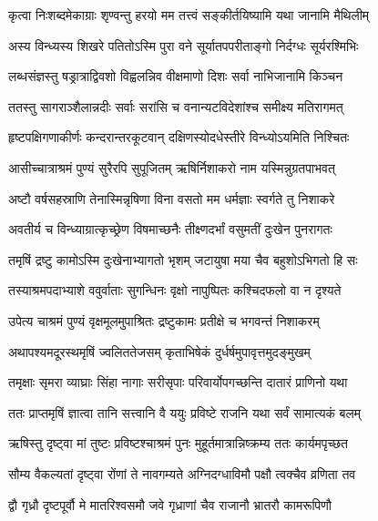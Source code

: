 \twolineshloka
{कृत्वा निःशब्दमेकाग्राः शृण्वन्तु हरयो मम}
{तत्त्वं सङ्कीर्तयिष्यामि यथा जानामि मैथिलीम्} %

\twolineshloka
{अस्य विन्ध्यस्य शिखरे पतितोऽस्मि पुरा वने}
{सूर्यातपपरीताङ्गो निर्दग्धः सूर्यरश्मिभिः} %

\twolineshloka
{लब्धसंज्ञस्तु षड्रात्राद्विवशो विह्वलन्निव}
{वीक्षमाणो दिशः सर्वा नाभिजानामि किञ्चन} %

\twolineshloka
{ततस्तु सागराञ्शैलान्नदीः सर्वाः सरांसि च}
{वनान्यटविदेशांश्च समीक्ष्य मतिरागमत्} %

\twolineshloka
{हृष्टपक्षिगणाकीर्णः कन्दरान्तरकूटवान्}
{दक्षिणस्योदधेस्तीरे विन्ध्योऽयमिति निश्चितः} %

\twolineshloka
{आसीच्चात्राश्रमं पुण्यं सुरैरपि सुपूजितम्}
{ऋषिर्निशाकरो नाम यस्मिन्नुग्रतपाभवत्} %

\twolineshloka
{अष्टौ वर्षसहस्राणि तेनास्मिन्नृषिणा विना}
{वसतो मम धर्मज्ञाः स्वर्गते तु निशाकरे} %

\twolineshloka
{अवतीर्य च विन्ध्याग्रात्कृच्छ्रेण विषमाच्छनैः}
{तीक्ष्णदर्भां वसुमतीं दुःखेन पुनरागतः} %

\twolineshloka
{तमृषिं द्रष्टु कामोऽस्मि दुःखेनाभ्यागतो भृशम्}
{जटायुषा मया चैव बहुशोऽभिगतो हि सः} %

\twolineshloka
{तस्याश्रमपदाभ्याशे ववुर्वाताः सुगन्धिनः}
{वृक्षो नापुष्पितः कश्चिदफलो वा न दृश्यते} %

\twolineshloka
{उपेत्य चाश्रमं पुण्यं वृक्षमूलमुपाश्रितः}
{द्रष्टुकामः प्रतीक्षे च भगवन्तं निशाकरम्} %

\twolineshloka
{अथापश्यमदूरस्थमृषिं ज्वलिततेजसम्}
{कृताभिषेकं दुर्धर्षमुपावृत्तमुदङ्मुखम्} %

\twolineshloka
{तमृक्षाः सृमरा व्याघ्राः सिंहा नागाः सरीसृपाः}
{परिवार्योपगच्छन्ति दातारं प्राणिनो यथा} %

\twolineshloka
{ततः प्राप्तमृषिं ज्ञात्वा तानि सत्त्वानि वै ययुः}
{प्रविष्टे राजनि यथा सर्वं सामात्यकं बलम्} %

\twolineshloka
{ऋषिस्तु दृष्ट्वा मां तुष्टः प्रविष्टश्चाश्रमं पुनः}
{मुहूर्तमात्रान्निष्क्रम्य ततः कार्यमपृच्छत} %

\twolineshloka
{सौम्य वैकल्यतां दृष्ट्वा रोंणां ते नावगम्यते}
{अग्निदग्धाविमौ पक्षौ त्वक्चैव व्रणिता तव} %

\twolineshloka
{द्वौ गृध्रौ दृष्टपूर्वौ मे मातरिश्वसमौ जवे}
{गृध्राणां चैव राजानौ भ्रातरौ कामरूपिणौ} %

